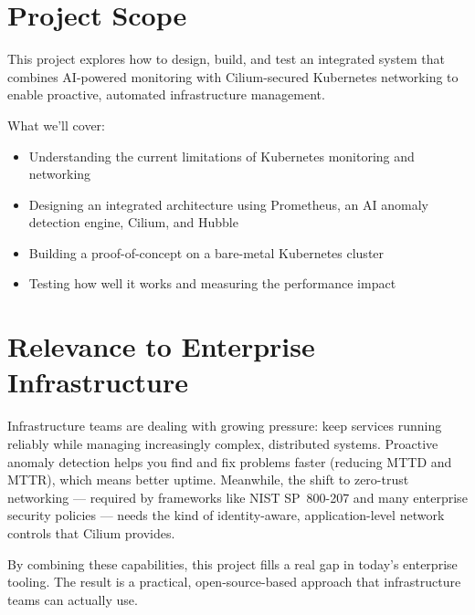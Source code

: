 \section{Project Scope}

This project explores how to design, build, and test an integrated system that combines AI-powered monitoring with Cilium-secured Kubernetes networking to enable proactive, automated infrastructure management.

What we'll cover:
\begin{itemize}
    \item Understanding the current limitations of Kubernetes monitoring and networking
    \item Designing an integrated architecture using Prometheus, an AI anomaly detection engine, Cilium, and Hubble
    \item Building a proof-of-concept on a bare-metal Kubernetes cluster
    \item Testing how well it works and measuring the performance impact
\end{itemize}

\section{Relevance to Enterprise Infrastructure}

Infrastructure teams are dealing with growing pressure: keep services running reliably while managing increasingly complex, distributed systems. Proactive anomaly detection helps you find and fix problems faster (reducing MTTD and MTTR), which means better uptime. Meanwhile, the shift to zero-trust networking — required by frameworks like NIST SP~800-207 and many enterprise security policies — needs the kind of identity-aware, application-level network controls that Cilium provides.

By combining these capabilities, this project fills a real gap in today's enterprise tooling. The result is a practical, open-source-based approach that infrastructure teams can actually use.
